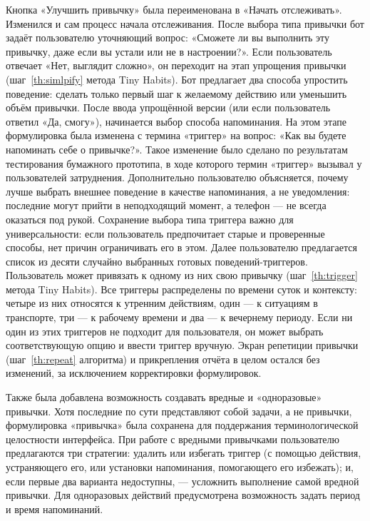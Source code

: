 \documentclass[pdflatex,sn-mathphys-num]{sn-jnl}%
\theoremstyle{thmstyleone}%
\theoremstyle{thmstyletwo}%
\theoremstyle{thmstylethree}%
\begin{document}
Кнопка «Улучшить привычку» была переименована в «Начать отслеживать». Изменился и сам процесс начала отслеживания. После выбора типа привычки бот задаёт пользователю уточняющий вопрос: «Сможете ли вы выполнить эту привычку, даже если вы устали или не в настроении?». Если пользователь отвечает «Нет, выглядит сложно», он переходит на этап упрощения привычки (шаг~\ref{th:simlpify} метода Tiny Habits). Бот предлагает два способа упростить поведение: сделать только первый шаг к желаемому действию или уменьшить объём привычки. После ввода упрощённой версии (или если пользователь ответил «Да, смогу»), начинается выбор способа напоминания. На этом этапе формулировка была изменена с термина «триггер» на вопрос: «Как вы будете напоминать себе о привычке?». Такое изменение было сделано по результатам тестирования бумажного прототипа, в ходе которого термин «триггер» вызывал у пользователей затруднения. Дополнительно пользователю объясняется, почему лучше выбрать внешнее поведение в качестве напоминания, а не уведомления: последние могут прийти в неподходящий момент, а телефон — не всегда оказаться под рукой. Сохранение выбора типа триггера важно для универсальности: если пользователь предпочитает старые и проверенные способы, нет причин ограничивать его в этом. Далее пользователю предлагается список из десяти случайно выбранных готовых поведений-триггеров. Пользователь может привязать к одному из них свою привычку (шаг~\ref{th:trigger} метода Tiny Habits). Все триггеры распределены по времени суток и контексту: четыре из них относятся к утренним действиям, один — к ситуациям в транспорте, три — к рабочему времени и два — к вечернему периоду. Если ни один из этих триггеров не подходит для пользователя, он может выбрать соответствующую опцию и ввести триггер вручную. Экран репетиции привычки (шаг~\ref{th:repeat} алгоритма) и прикрепления отчёта в целом остался без изменений, за исключением корректировки формулировок.

Также была добавлена возможность создавать вредные и «одноразовые» привычки. Хотя последние по сути представляют собой задачи, а не привычки, формулировка «привычка» была сохранена для поддержания терминологической целостности интерфейса. При работе с вредными привычками пользователю предлагаются три стратегии: удалить или избегать триггер (с помощью действия, устраняющего его, или установки напоминания, помогающего его избежать); и, если первые два варианта недоступны, — усложнить выполнение самой вредной привычки. Для одноразовых действий предусмотрена возможность задать период и время напоминаний.
\end{document}
